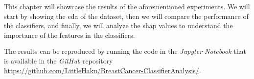 This chapter will showcase the results of the aforementioned experiments. We will start by showing the \acl{eda} of the dataset, then we will compare the performance of the classifiers, and finally, we will analyze the \ac{shap} values to understand the importance of the features in the classifiers.

The results can be reproduced by running the code in the \textit{Jupyter Notebook} that is available in the \textit{GitHub} repository \href{https://github.com/LittleHaku/BreastCancer-ClassifierAnalysis/}{https://github.com/LittleHaku/BreastCancer-ClassifierAnalysis/}.